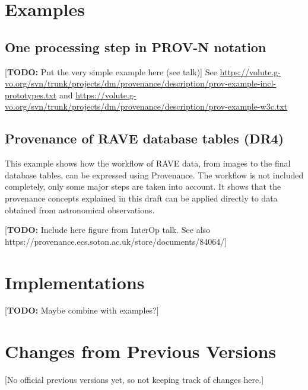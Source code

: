 \documentclass[11pt,a4paper]{ivoa}
\newcommand{\TODO}[1]{\noindent \textcolor{todocolor}{[\textbf{TODO:} #1]}}
\begin{document}
\section{Examples}\label{sec:examples}

\subsection{One processing step in PROV-N notation}
\TODO{Put the very simple example here (see talk)}
See \url{https://volute.g-vo.org/svn/trunk/projects/dm/provenance/description/prov-example-incl-prototypes.txt}
and \url{https://volute.g-vo.org/svn/trunk/projects/dm/provenance/description/prov-example-w3c.txt}


\subsection{Provenance of RAVE database tables (DR4)}
This example shows how the workflow of RAVE data, from images to the final database tables, can be expressed using Provenance. 
The workflow is not included completely, only some major steps are taken into account. It shows that the provenance concepts explained in this draft can be applied directly to data obtained from astronomical observations.

\TODO{Include here figure from InterOp talk. See also https://provenance.ecs.soton.ac.uk/store/documents/84064/}



\section{Implementations}
\TODO{Maybe combine with examples?}


\appendix
\section{Changes from Previous Versions}
[No official previous versions yet, so not keeping track of changes here.]



\end{document}

